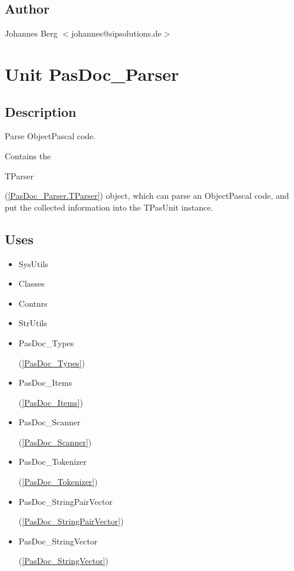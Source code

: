 \documentclass{report}
\begin{document}
\section{Author}
\par
Johannes Berg {$<$}johannes@sipsolutions.de{$>$}

\chapter{Unit PasDoc{\_}Parser}
\label{PasDoc_Parser}
\section{Description}
Parse ObjectPascal code.\hfill\vspace*{1ex}

     

Contains the \begin{ttfamily}TParser\end{ttfamily}(\ref{PasDoc_Parser.TParser}) object, which can parse an ObjectPascal code, and put the collected information into the TPasUnit instance.
\section{Uses}
\begin{itemize}
\item \begin{ttfamily}SysUtils\end{ttfamily}\item \begin{ttfamily}Classes\end{ttfamily}\item \begin{ttfamily}Contnrs\end{ttfamily}\item \begin{ttfamily}StrUtils\end{ttfamily}\item \begin{ttfamily}PasDoc{\_}Types\end{ttfamily}(\ref{PasDoc_Types})\item \begin{ttfamily}PasDoc{\_}Items\end{ttfamily}(\ref{PasDoc_Items})\item \begin{ttfamily}PasDoc{\_}Scanner\end{ttfamily}(\ref{PasDoc_Scanner})\item \begin{ttfamily}PasDoc{\_}Tokenizer\end{ttfamily}(\ref{PasDoc_Tokenizer})\item \begin{ttfamily}PasDoc{\_}StringPairVector\end{ttfamily}(\ref{PasDoc_StringPairVector})\item \begin{ttfamily}PasDoc{\_}StringVector\end{ttfamily}(\ref{PasDoc_StringVector})\end{itemize}
\end{document}
